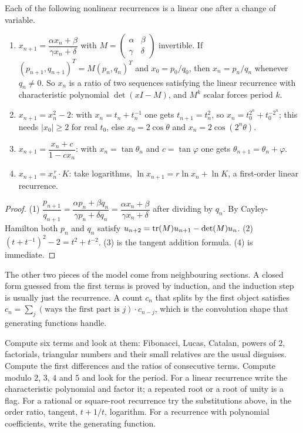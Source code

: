 \begin{proposition}
Each of the following nonlinear recurrences is a linear one after a change of variable.
\begin{enumerate}[nosep]
\item $x_{n+1}=\dfrac{\alpha x_n+\beta}{\gamma x_n+\delta}$ with $M=\begin{pmatrix}\alpha&\beta\\ \gamma&\delta\end{pmatrix}$ invertible. If $(p_{n+1},q_{n+1})^{T}=M(p_n,q_n)^{T}$ and $x_0=p_0/q_0$, then $x_n=p_n/q_n$ whenever $q_n\ne 0$. So $x_n$ is a ratio of two sequences satisfying the linear recurrence with characteristic polynomial $\det(xI-M)$, and $M^k$ scalar forces period $k$.
\item $x_{n+1}=x_n^2-2$: with $x_n=t_n+t_n^{-1}$ one gets $t_{n+1}=t_n^2$, so $x_n=t_0^{2^n}+t_0^{-2^n}$; this needs $|x_0|\ge 2$ for real $t_0$, else $x_0=2\cos\theta$ and $x_n=2\cos(2^n\theta)$.
\item $x_{n+1}=\dfrac{x_n+c}{1-cx_n}$: with $x_n=\tan\theta_n$ and $c=\tan\varphi$ one gets $\theta_{n+1}=\theta_n+\varphi$.
\item $x_{n+1}=x_n^{\,r}\cdot K$: take logarithms, $\ln x_{n+1}=r\ln x_n+\ln K$, a first-order linear recurrence.
\end{enumerate}
\end{proposition}

\begin{proof}
(1) $\dfrac{p_{n+1}}{q_{n+1}}=\dfrac{\alpha p_n+\beta q_n}{\gamma p_n+\delta q_n}=\dfrac{\alpha x_n+\beta}{\gamma x_n+\delta}$ after dividing by $q_n$. By Cayley-Hamilton both $p_n$ and $q_n$ satisfy $u_{n+2}=\operatorname{tr}(M)u_{n+1}-\det(M)u_n$. (2) $(t+t^{-1})^2-2=t^2+t^{-2}$. (3) is the tangent addition formula. (4) is immediate.
\end{proof}

The other two pieces of the model come from neighbouring sections. A closed form guessed from the first terms is proved by induction, and the induction step is usually just the recurrence. A count $c_n$ that splits by the first object satisfies $c_n=\sum_j(\text{ways the first part is }j)\cdot c_{n-j}$, which is the convolution shape that generating functions handle.

\begin{firstmoves}
Compute six terms and look at them: Fibonacci, Lucas, Catalan, powers of $2$, factorials, triangular numbers and their small relatives are the usual disguises. Compute the first differences and the ratios of consecutive terms. Compute modulo $2$, $3$, $4$ and $5$ and look for the period. For a linear recurrence write the characteristic polynomial and factor it; a repeated root or a root of unity is a flag. For a rational or square-root recurrence try the substitutions above, in the order ratio, tangent, $t+1/t$, logarithm. For a recurrence with polynomial coefficients, write the generating function.
\end{firstmoves}

